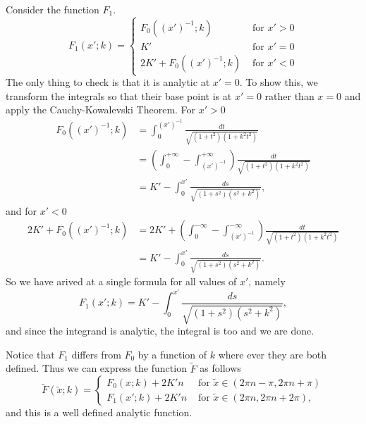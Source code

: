 Consider the function $F_1$.
\[
F_1(x';k) =
\begin{cases}
F_0((x')^{-1}; k)             & \text{ for } x' > 0 \\
K'                              & \text{ for } x' = 0 \\
2K' + F_0((x')^{-1}; k)   & \text{ for } x' < 0
\end{cases}
\]
The only thing to check is that it is analytic at $x'=0$. To show this, we transform the integrals so that their base point is at $x'=0$ rather than $x=0$ and apply the Cauchy-Kowalevski Theorem. For $x'>0$
\begin{align*}
F_0( (x')^{-1}; k)
&= \int_0^{(x')^{-1}} \frac{dt}{\sqrt{(1+t^2)(1+k^2t^2)}} \\
&= \left(\int_0^{+\infty} - \int_{(x')^{-1}}^{+\infty} \right) \frac{dt}{\sqrt{(1+t^2)(1+k^2t^2)}} \\
&= K' - \int_0^{x'} \frac{ds}{\sqrt{(1+s^2)(s^2+k^2)}},
\end{align*}
and for $x' < 0$
\begin{align*}
2 K' + F_0((x')^{-1}; k)
&= 2 K' + \left(\int_0^{-\infty} - \int_{(x')^{-1}}^{-\infty} \right) \frac{dt}{\sqrt{(1+t^2)(1+k^2t^2)}} \\
&=  K' - \int_0^{x'} \frac{ds}{\sqrt{(1+s^2)(s^2+k^2)}}.
\end{align*}
So we have arived at a single formula for all values of $x'$, namely
\[
F_1(x';k) = K' - \int_0^{x'} \frac{ds}{\sqrt{(1+s^2)(s^2+k^2)}},
\]
and since the integrand is analytic, the integral is too and we are done.

Notice that $F_1$ differs from $F_0$ by a function of $k$ where ever they are both defined. Thus we can express the function $\tilde{F}$ as follows
\[
\tilde F(\tilde{x};k) =
\begin{cases}
F_0(x; k) + 2K'n             & \text{ for } \tilde x \in (2πn - π, 2πn + π) \\
F_1(x'; k) + 2K'n             & \text{ for } \tilde x \in (2πn, 2πn + 2π),
\end{cases}
\]
and this is a well defined analytic function.




